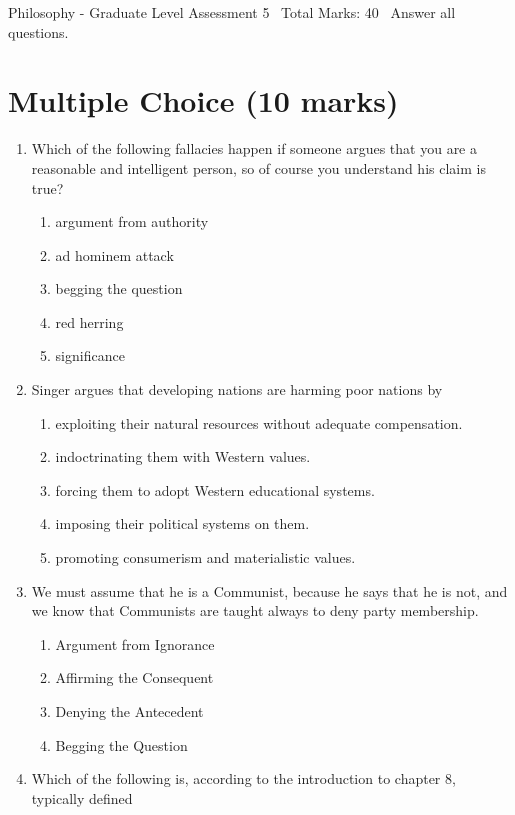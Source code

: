 \documentclass[12pt]{article}
\begin{document}
\begin{center}
Philosophy - Graduate Level Assessment 5 \
Total Marks: 40 \
Answer all questions.
\end{center}

\section*{Multiple Choice (10 marks)}
\begin{enumerate}[label=\arabic*.]
\item Which of the following fallacies happen if someone argues that you are a reasonable and
intelligent person, so of course you understand his claim is true?
\begin{enumerate}[label=(\alph*)]
    \item argument from authority
    \item ad hominem attack
    \item begging the question
    \item red herring
    \item significance
\end{enumerate}
\item Singer argues that developing nations are harming poor nations by
\begin{enumerate}[label=(\alph*)]
    \item exploiting their natural resources without adequate compensation.
    \item indoctrinating them with Western values.
    \item forcing them to adopt Western educational systems.
    \item imposing their political systems on them.
    \item promoting consumerism and materialistic values.
\end{enumerate}
\item We must assume that he is a Communist, because he says that he is not, and we know that
Communists are taught always to deny party membership.
\begin{enumerate}[label=(\alph*)]
    \item Argument from Ignorance
    \item Affirming the Consequent
    \item Denying the Antecedent
    \item Begging the Question
\end{enumerate}
\item Which of the following is, according to the introduction to chapter 8, typically defined

\end{enumerate}
\end{document}
